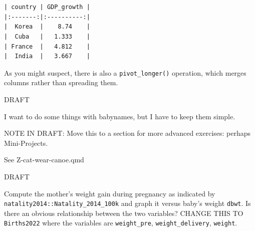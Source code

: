 \documentclass[
  letterpaper,
  DIV=11,
  numbers=noendperiod,
  oneside]{scrartcl}
\begin{document}
\begin{verbatim}


| country | GDP_growth |
|:-------:|:----------:|
|  Korea  |    8.74    |
|  Cuba   |   1.333    |
| France  |   4.812    |
|  India  |   3.667    |
\end{verbatim}

As you might suspect, there is also a \texttt{pivot\_longer()}
operation, which merges columns rather than spreading them.

\begin{tcolorbox}[enhanced jigsaw, colbacktitle=quarto-callout-note-color!10!white, opacityback=0, breakable, opacitybacktitle=0.6, colback=white, coltitle=black, arc=.35mm, title=\textcolor{quarto-callout-note-color}{\faInfo}\hspace{0.5em}{Exercise 5.27 Q05-113}, left=2mm, colframe=quarto-callout-note-color-frame, rightrule=.15mm, bottomrule=.15mm, leftrule=.75mm, bottomtitle=1mm, toptitle=1mm, titlerule=0mm, toprule=.15mm]

DRAFT

I want to do some things with babynames, but I have to keep them simple.

NOTE IN DRAFT: Move this to a section for more advanced exercises:
perhaps Mini-Projects.

See Z-cat-wear-canoe.qmd

\end{tcolorbox}

\begin{tcolorbox}[enhanced jigsaw, colbacktitle=quarto-callout-note-color!10!white, opacityback=0, breakable, opacitybacktitle=0.6, colback=white, coltitle=black, arc=.35mm, title=\textcolor{quarto-callout-note-color}{\faInfo}\hspace{0.5em}{Exercise 5.28 Q05-114}, left=2mm, colframe=quarto-callout-note-color-frame, rightrule=.15mm, bottomrule=.15mm, leftrule=.75mm, bottomtitle=1mm, toptitle=1mm, titlerule=0mm, toprule=.15mm]

DRAFT

Compute the mother's weight gain during pregnancy as indicated by
\texttt{natality2014::Natality\_2014\_100k} and graph it versus baby's
weight \texttt{dbwt}. Is there an obvious relationship between the two
variables? CHANGE THIS TO \texttt{Births2022} where the variables are
\texttt{weight\_pre}, \texttt{weight\_delivery}, \texttt{weight}.

\end{tcolorbox}
\end{document}
